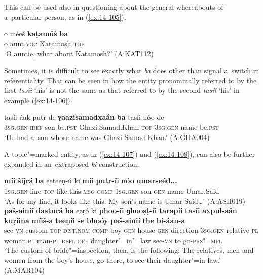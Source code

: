 This can be used also in questioning about the general whereabouts of a~particular person, as in (\ref{ex:14-105}).

\begin{exe}
\ex
\label{ex:14-105}
\gll o méeš \textbf{kaṭamúš} \textbf{ba}\\
o aunt.\textsc{voc} Katamosh \textsc{top}\\
\glt `O auntie, what about Katamosh?' (A:KAT112)
\end{exe}

Sometimes, it is difficult to see exactly what \textit{ba} does other than signal a~switch in referentiality. That can be seen in how the entity pronominally referred to by the first \textit{tasíi} `his' is not the same as that referred to by the second \textit{tasíi} `his' in example (\ref{ex:14-106}).

\begin{exe}
\ex
\label{ex:14-106}
\gll tasíi áak putr de \textbf{ɣaazisamadxaán} \textbf{ba}  tasíi nóo de \\
\textsc{3sg.gen} \textsc{idef} son be.\textsc{pst} Ghazi.Samad.Khan \textsc{top}  \textsc{3sg.gen} name be.\textsc{pst} \\
\glt `He had a~son whose name was Ghazi Samad Khan.' (A:GHA004)
\end{exe}

A topic"=marked entity, as in (\ref{ex:14-107}) and (\ref{ex:14-108}), can also be further expanded in an~extraposed \textit{ki}-construction.

\begin{exe}
\ex
\label{ex:14-107}
\gll \textbf{míi} \textbf{šiǰrá} \textbf{ba} eeteeṇ-ú ki \textbf{míi} \textbf{putr-íi} \textbf{nóo} \textbf{umarseéd...}\\
\textsc{1sg.gen} line \textsc{top} like.this-\textsc{msg } \textsc{comp} \textsc{1sg.gen} son-\textsc{gen} name Umar.Said\\
\glt `As for my line, it looks like this: My son's name is Umar Said{\ldots}' (A:ASH019)
\ex
\label{ex:14-108}
\gll \textbf{paš-ainií} \textbf{dasturá} \textbf{ba} eeṛó ki \textbf{phoo-íi} \textbf{ɡhooṣṭ-íi} \textbf{tarapíi} \textbf{tasíi} \textbf{axpul-aán} \textbf{kuṛíina} \textbf{míiš-a} \textbf{teeṇíi} \textbf{se} \textbf{bhoóy} \textbf{paš-ainií} \textbf{the} \textbf{bi-áan-a}\\
see-\textsc{vn} custom \textsc{top} \textsc{dist.nom} \textsc{comp} boy-\textsc{gen} house-\textsc{gen} direction \textsc{3sg.gen} relative-\textsc{pl} woman.\textsc{pl}  man-\textsc{pl} \textsc{refl} \textsc{def} daughter"=in"=law see-\textsc{vn} to go-\textsc{prs"=mpl}\\
\glt `The custom of bride"=inspection, then, is the following: The relatives, men and women from the boy's house, go there, to see their daughter"=in law.' (A:MAR104)
\end{exe}

